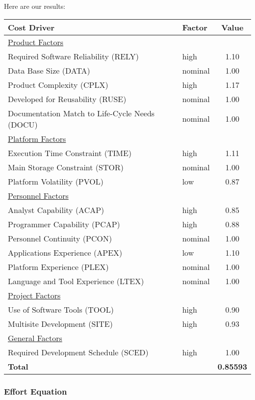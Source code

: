 \pagebreak
Here are our results:
\begin{center}
	\begin{tabular}{l l c}
		\hline
		\textbf{Cost Driver} & \textbf{Factor} & \textbf{Value} \\
		\hline \hline
		\underline{Product Factors} & & \\
		Required Software Reliability (RELY) & high & 1.10 \\
		Data Base Size (DATA) & nominal & 1.00 \\
		Product Complexity (CPLX) & high & 1.17 \\
		Developed for Reusability (RUSE) & nominal & 1.00 \\
		Documentation Match to Life-Cycle Needs (DOCU) & nominal & 1.00 \\
		\hline
		\underline{Platform Factors} & & \\
		Execution Time Constraint (TIME) & high & 1.11 \\
		Main Storage Constraint (STOR) & nominal & 1.00 \\
		Platform Volatility (PVOL) & low & 0.87 \\
		\hline
		\underline{Personnel Factors} & & \\
		Analyst Capability (ACAP) & high & 0.85 \\
		Programmer Capability (PCAP) & high & 0.88 \\
		Personnel Continuity (PCON) & nominal & 1.00 \\
		Applications Experience (APEX) & low & 1.10 \\
		Platform Experience (PLEX) & nominal & 1.00 \\
		Language and Tool Experience (LTEX) & nominal & 1.00 \\
		\hline
		\underline{Project Factors} & & \\
		Use of Software Tools (TOOL) & high & 0.90 \\
		Multisite Development (SITE) & high & 0.93 \\
		\hline
		\underline{General Factors} & & \\
		Required Development Schedule (SCED) & high & 1.00 \\
		\hline \hline
		\textbf{Total} & & \textbf{0.85593} \\
		\hline
	\end{tabular}
\end{center}

\pagebreak
\subsubsection{Effort Equation}

